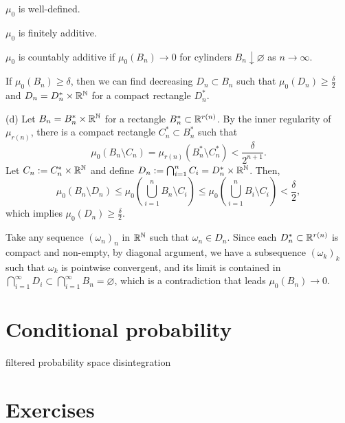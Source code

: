 \documentclass{../../large}
\begin{document}
\begin{parts}
\item $\mu_0$ is well-defined.
\item $\mu_0$ is finitely additive.
\item $\mu_0$ is countably additive if $\mu_0(B_n)\to0$ for cylinders $B_n\downarrow\varnothing$ as $n\to\infty$.
\item If $\mu_0(B_n)\ge\delta$, then we can find decreasing $D_n\subset B_n$ such that $\mu_0(D_n)\ge\frac\delta2$ and $D_n=D_n^*\times\mathbb{R}^{\mathbb{N}}$ for a compact rectangle $D_n^*$.

\end{parts}
\begin{pf}


(d)
Let $B_n=B_n^*\times\mathbb{R}^{\mathbb{N}}$ for a rectangle $B_n^*\subset\mathbb{R}^{r(n)}$.
By the inner regularity of $\mu_{r(n)}$, there is a compact rectangle $C_n^*\subset B_n^*$ such that
\[\mu_0(B_n\setminus C_n)=\mu_{r(n)}(B_n^*\setminus C_n^*)<\frac\delta{2^{n+1}}.\]
Let $C_n:=C_n^*\times\mathbb{R}^{\mathbb{N}}$ and define $D_n:=\bigcap_{i=1}^nC_i=D_n^*\times\mathbb{R}^{\mathbb{N}}$.
Then,
\[\mu_0(B_n\setminus D_n)\le\mu_0(\bigcup_{i=1}^nB_n\setminus C_i)\le\mu_0(\bigcup_{i=1}^nB_i\setminus C_i)<\frac\delta2,\]
which implies $\mu_0(D_n)\ge\frac\delta2$.

Take any sequence $(\omega_n)_n$ in $\mathbb{R}^{\mathbb{N}}$ such that $\omega_n\in D_n$.
Since each $D_n^*\subset\mathbb{R}^{r(n)}$ is compact and non-empty, by diagonal argument, we have a subsequence $(\omega_k)_k$ such that $\omega_k$ is pointwise convergent, and its limit is contained in $\bigcap_{i=1}^\infty D_i\subset\bigcap_{i=1}^\infty B_n=\varnothing$, which is a contradiction that leads $\mu_0(B_n)\to0$.
\end{pf}


\section{Conditional probability}
filtered probability space
disintegration







\section*{Exercises}
\end{document}
